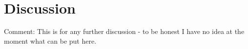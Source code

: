 \section{Discussion}
Comment: This is for any further discussion - to be honest I have no idea at the moment what can be put here.
